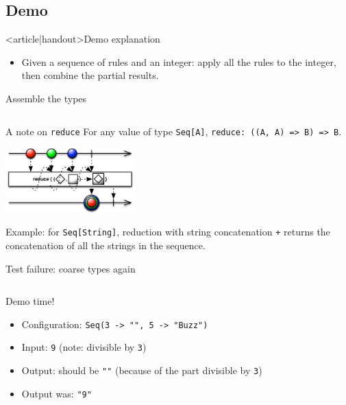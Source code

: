 \subsection{Demo}

\begin{frame}<article|handout>{Demo explanation}
  \begin{itemize}
  \item Given a sequence of rules and an integer: apply all the rules to the integer, then combine the partial results.
  \end{itemize}

\end{frame}

\begin{frame}[label=first-general,fragile]{Assemble the types}
  \inputminted[gobble=2]{scala}{FizzBuzz5.scala}
\end{frame}

\begin{frame}[fragile]{A note on \texttt{reduce}}
  For any value of type \texttt{Seq[A]}, \texttt{reduce: ((A, A) => B) => B}.
  \begin{center}
    \includegraphics[height=2.5cm]{reduce.png}
  \end{center}

  Example: for \texttt{Seq[String]}, reduction with string concatenation \texttt{+} returns the concatenation of all the strings in the sequence.
\end{frame}

\begin{frame}[fragile]{Test failure: coarse types again}
  \inputminted[gobble=2]{console}{testQuick9.console}

  \begin{block}{Demo time!}
    \begin{itemize}
    \item Configuration: \texttt{Seq(3 -> "", 5 -> "Buzz")}
    \item Input: \texttt{9} (note: divisible by \texttt{3})
    \item Output: should be \texttt{""} (because of the part divisible by \texttt{3})
    \item Output was: \texttt{"9"}
    \end{itemize}
  \end{block}
\end{frame}

